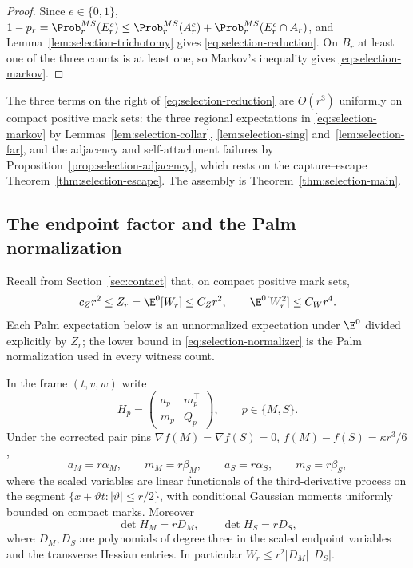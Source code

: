 \begin{proof}
Since $e\in\{0,1\}$, $1-p_r=\Prob^{MS}_r(E_r^c)\le\Prob^{MS}_r(A_r^c)+\Prob^{MS}_r(E_r^c\cap A_r)$, and Lemma~\ref{lem:selection-trichotomy} gives \eqref{eq:selection-reduction}. On $B_r$ at least one of the three counts is at least one, so Markov's inequality gives \eqref{eq:selection-markov}.
\end{proof}

The three terms on the right of \eqref{eq:selection-reduction} are $O(r^3)$ uniformly on compact positive mark sets: the three regional expectations in \eqref{eq:selection-markov} by Lemmas~\ref{lem:selection-collar}, \ref{lem:selection-sing} and~\ref{lem:selection-far}, and the adjacency and self-attachment failures by Proposition~\ref{prop:selection-adjacency}, which rests on the capture--escape Theorem~\ref{thm:selection-escape}. The assembly is Theorem~\ref{thm:selection-main}.

\subsection{The endpoint factor and the Palm normalization}\label{ssec:selection-endpoint}

Recall from Section~\ref{sec:contact} that, on compact positive mark sets,
\begin{equation}\label{eq:selection-normalizer}
c_Zr^2\le Z_r=\E^0[W_r]\le C_Zr^2,\qquad\E^0[W_r^2]\le C_Wr^4 .
\end{equation}
Each Palm expectation below is an unnormalized expectation under $\E^0$ divided explicitly by $Z_r$; the lower bound in \eqref{eq:selection-normalizer} is the Palm normalization used in every witness count.

\begin{lemma}\label{lem:selection-endpoint}
In the frame $(t,v,w)$ write
\begin{equation}\label{eq:selection-frame}
H_p=\begin{pmatrix}a_p&m_p^{\top}\\ m_p&Q_p\end{pmatrix},\qquad p\in\{M,S\}.
\end{equation}
Under the corrected pair pins $\nabla f(M)=\nabla f(S)=0$, $f(M)-f(S)=\kappa r^3/6$,
\begin{equation}\label{eq:selection-scaled}
a_M=r\alpha_M,\qquad m_M=r\beta_M,\qquad a_S=r\alpha_S,\qquad m_S=r\beta_S,
\end{equation}
where the scaled variables are linear functionals of the third-derivative process on the segment $\{x+\vartheta t:|\vartheta|\le r/2\}$, with conditional Gaussian moments uniformly bounded on compact marks. Moreover
\begin{equation}\label{eq:selection-softdet}
\det H_M=rD_M,\qquad\det H_S=rD_S,
\end{equation}
where $D_M,D_S$ are polynomials of degree three in the scaled endpoint variables and the transverse Hessian entries. In particular $W_r\le r^2|D_M|\,|D_S|$.
\end{lemma}

